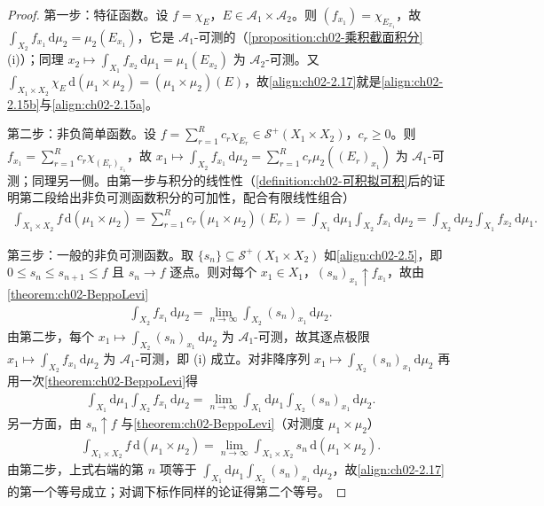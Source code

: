 \documentclass[../../main.tex]{subfiles}%
\begin{document}
\begin{proof}
第一步：特征函数。设 $f=\chi_E$，$E\in\mathscr A_1\times\mathscr A_2$。则 $(f_{x_1})=\chi_{E_{x_1}}$，故 $\int_{X_2}f_{x_1}\,\mathrm{d}\mu_2=\mu_2(E_{x_1})$，它是 $\mathscr A_1$-可测的（\cref{proposition:ch02-乘积截面积分}(i)）；同理 $x_2\mapsto\int_{X_1}f_{x_2}\,\mathrm{d}\mu_1=\mu_1(E_{x_2})$ 为 $\mathscr A_2$-可测。又 $\int_{X_1\times X_2}\chi_E\,\mathrm{d}(\mu_1\times\mu_2)=(\mu_1\times\mu_2)(E)$，故\eqref{align:ch02-2.17}就是\eqref{align:ch02-2.15b}与\eqref{align:ch02-2.15a}。

第二步：非负简单函数。设 $f=\sum_{r=1}^Rc_r\chi_{E_r}\in\mathscr S^+(X_1\times X_2)$，$c_r\geqslant0$。则 $f_{x_1}=\sum_{r=1}^Rc_r\chi_{(E_r)_{x_1}}$，故 $x_1\mapsto\int_{X_2}f_{x_1}\,\mathrm{d}\mu_2=\sum_{r=1}^Rc_r\mu_2((E_r)_{x_1})$ 为 $\mathscr A_1$-可测；同理另一侧。由第一步与积分的线性性（\cref{definition:ch02-可积拟可积}后的证明第二段给出非负可测函数积分的可加性，配合有限线性组合）
\begin{align*}
\int_{X_1\times X_2}f\,\mathrm{d}(\mu_1\times\mu_2)=\sum_{r=1}^Rc_r(\mu_1\times\mu_2)(E_r)
=\int_{X_1}\mathrm{d}\mu_1\int_{X_2}f_{x_1}\,\mathrm{d}\mu_2=\int_{X_2}\mathrm{d}\mu_2\int_{X_1}f_{x_2}\,\mathrm{d}\mu_1.
\end{align*}

第三步：一般的非负可测函数。取 $\{s_n\}\subseteq\mathscr S^+(X_1\times X_2)$ 如\eqref{align:ch02-2.5}，即 $0\leqslant s_n\leqslant s_{n+1}\leqslant f$ 且 $s_n\to f$ 逐点。则对每个 $x_1\in X_1$，$(s_n)_{x_1}\uparrow f_{x_1}$，故由\cref{theorem:ch02-BeppoLevi}
\begin{align*}
\int_{X_2}f_{x_1}\,\mathrm{d}\mu_2=\lim_{n\to\infty}\int_{X_2}(s_n)_{x_1}\,\mathrm{d}\mu_2.
\end{align*}
由第二步，每个 $x_1\mapsto\int_{X_2}(s_n)_{x_1}\,\mathrm{d}\mu_2$ 为 $\mathscr A_1$-可测，故其逐点极限 $x_1\mapsto\int_{X_2}f_{x_1}\,\mathrm{d}\mu_2$ 为 $\mathscr A_1$-可测，即 (i) 成立。对非降序列 $x_1\mapsto\int_{X_2}(s_n)_{x_1}\,\mathrm{d}\mu_2$ 再用一次\cref{theorem:ch02-BeppoLevi}得
\begin{align*}
\int_{X_1}\mathrm{d}\mu_1\int_{X_2}f_{x_1}\,\mathrm{d}\mu_2
=\lim_{n\to\infty}\int_{X_1}\mathrm{d}\mu_1\int_{X_2}(s_n)_{x_1}\,\mathrm{d}\mu_2.
\end{align*}
另一方面，由 $s_n\uparrow f$ 与\cref{theorem:ch02-BeppoLevi}（对测度 $\mu_1\times\mu_2$）
\begin{align*}
\int_{X_1\times X_2}f\,\mathrm{d}(\mu_1\times\mu_2)=\lim_{n\to\infty}\int_{X_1\times X_2}s_n\,\mathrm{d}(\mu_1\times\mu_2).
\end{align*}
由第二步，上式右端的第 $n$ 项等于 $\int_{X_1}\mathrm{d}\mu_1\int_{X_2}(s_n)_{x_1}\,\mathrm{d}\mu_2$，故\eqref{align:ch02-2.17}的第一个等号成立；对调下标作同样的论证得第二个等号。
\end{proof}
\end{document}

